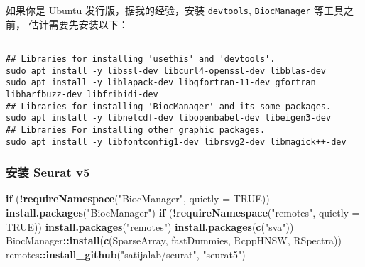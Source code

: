 \documentclass[
]{article}
\newenvironment{Shaded}{\begin{snugshade}}{\end{snugshade}}
\newcommand{\ControlFlowTok}[1]{\textcolor[rgb]{0.13,0.29,0.53}{\textbf{#1}}}
\newcommand{\DataTypeTok}[1]{\textcolor[rgb]{0.13,0.29,0.53}{#1}}
\newcommand{\KeywordTok}[1]{\textcolor[rgb]{0.13,0.29,0.53}{\textbf{#1}}}
\newcommand{\NormalTok}[1]{#1}
\newcommand{\OperatorTok}[1]{\textcolor[rgb]{0.81,0.36,0.00}{\textbf{#1}}}
\newcommand{\OtherTok}[1]{\textcolor[rgb]{0.56,0.35,0.01}{#1}}
\newcommand{\StringTok}[1]{\textcolor[rgb]{0.31,0.60,0.02}{#1}}
\begin{document}
如果你是 Ubuntu 发行版，据我的经验，安装 \texttt{devtools}, \texttt{BiocManager} 等工具之前，
估计需要先安装以下：

\begin{tcolorbox}[colback = gray!10, colframe = red!50, width = 16cm, arc = 1mm, auto outer arc, title = {Bash input}]
\begin{verbatim}

## Libraries for installing 'usethis' and 'devtools'.
sudo apt install -y libssl-dev libcurl4-openssl-dev libblas-dev
sudo apt install -y liblapack-dev libgfortran-11-dev gfortran libharfbuzz-dev libfribidi-dev
## Libraries for installing 'BiocManager' and its some packages.
sudo apt install -y libnetcdf-dev libopenbabel-dev libeigen3-dev
## Libraries For installing other graphic packages.
sudo apt install -y libfontconfig1-dev librsvg2-dev libmagick++-dev

\end{verbatim}
\end{tcolorbox}

\hypertarget{ux5b89ux88c5-seurat-v5}{%
\subsubsection{安装 Seurat v5}\label{ux5b89ux88c5-seurat-v5}}

\begin{Shaded}
\begin{Highlighting}[]
\ControlFlowTok{if}\NormalTok{ (}\OperatorTok{!}\KeywordTok{requireNamespace}\NormalTok{(}\StringTok{"BiocManager"}\NormalTok{, }\DataTypeTok{quietly =} \OtherTok{TRUE}\NormalTok{))}
    \KeywordTok{install.packages}\NormalTok{(}\StringTok{"BiocManager"}\NormalTok{)}
\ControlFlowTok{if}\NormalTok{ (}\OperatorTok{!}\KeywordTok{requireNamespace}\NormalTok{(}\StringTok{"remotes"}\NormalTok{, }\DataTypeTok{quietly =} \OtherTok{TRUE}\NormalTok{))}
    \KeywordTok{install.packages}\NormalTok{(}\StringTok{"remotes"}\NormalTok{)}
\KeywordTok{install.packages}\NormalTok{(}\KeywordTok{c}\NormalTok{(}\StringTok{"sva"}\NormalTok{))}
\NormalTok{BiocManager}\OperatorTok{::}\KeywordTok{install}\NormalTok{(}\KeywordTok{c}\NormalTok{(}\StringTok{\textquotesingle{}SparseArray\textquotesingle{}}\NormalTok{, }\StringTok{\textquotesingle{}fastDummies\textquotesingle{}}\NormalTok{, }\StringTok{\textquotesingle{}RcppHNSW\textquotesingle{}}\NormalTok{, }\StringTok{\textquotesingle{}RSpectra\textquotesingle{}}\NormalTok{))}
\NormalTok{remotes}\OperatorTok{::}\KeywordTok{install\_github}\NormalTok{(}\StringTok{"satijalab/seurat"}\NormalTok{, }\StringTok{"seurat5"}\NormalTok{)}
\end{Highlighting}
\end{Shaded}
\end{document}
